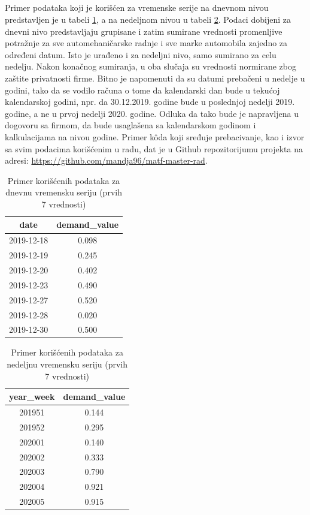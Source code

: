 \documentclass[12pt,oneside]{memoir}
\begin{document}
\subsection{}
{\parindent0pt 
Primer podataka koji je korišćen za vremenske serije na dnevnom nivou predstavljen je u tabeli \ref{tbl: daily_data_example}, a na nedeljnom nivou u tabeli \ref{tbl: weekly_data_example}. Podaci dobijeni za dnevni nivo predstavljaju grupisane i zatim sumirane vrednosti promenljive potražnje za sve automehaničarske radnje i sve marke automobila zajedno za određeni datum. Isto je urađeno i za nedeljni nivo, samo sumirano za celu nedelju. Nakon konačnog sumiranja, u oba slučaja su vrednosti normirane zbog zaštite privatnosti firme. Bitno je napomenuti da su datumi prebačeni u nedelje u godini, tako da se vodilo računa o tome da kalendarski dan bude u tekućoj kalendarskoj godini, npr. da 30.12.2019. godine bude u poslednjoj nedelji 2019. godine, a ne u prvoj nedelji 2020. godine. Odluka da tako bude je napravljena u dogovoru sa firmom, da bude usaglašena sa kalendarskom godinom i kalkulacijama na nivou godine. Primer kôda koji sređuje prebacivanje, kao i izvor sa svim podacima korišćenim u radu, dat je u Github repozitorijumu projekta na adresi: \url{https://github.com/mandja96/matf-master-rad}.
}
\begin{table}
\centering
\caption{Primer korišćenih podataka za dnevnu vremensku seriju (prvih 7 vrednosti)}
\label{tbl: daily_data_example}
\begin{tabular}{ |c|c|} 
\hline
date & demand\_value \\
\hline
2019-12-18 & 0.098\\
2019-12-19 & 0.245\\
2019-12-20 & 0.402\\
2019-12-23 & 0.490\\
2019-12-27 & 0.520\\
2019-12-28 & 0.020\\
2019-12-30 & 0.500\\
\hline
\end{tabular}
\end{table}

\begin{table}
\centering
\caption{Primer korišćenih podataka za nedeljnu vremensku seriju (prvih 7 vrednosti)}
\label{tbl: weekly_data_example}
\begin{tabular}{ |c|c|} 
\hline
year\_week & demand\_value \\
\hline
201951 & 0.144\\
201952 & 0.295\\
202001 & 0.140\\
202002 & 0.333\\
202003 & 0.790\\
202004 & 0.921\\
202005 & 0.915\\
\hline
\end{tabular}
\end{table}
\end{document}

